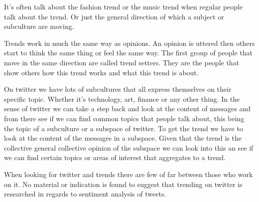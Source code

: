 It's often talk about the fashion trend or the music trend when regular people
talk about the trend. Or just the general direction of which a subject or
subculture are moving. 

Trends work in much the same way as opinions. An opinion is uttered then others start to think the same thing or
feel the same way. The first group of people that move in the same direction
are called trend setters. They are the people that show others how this trend works and
what this trend is about. 

On twitter we have lots of subcultures that all express themselves on their
specific topic. Whether it's technology, art, finance or any other thing.  
In the sense of twitter we can take a step back and look at the content of
messages and from there see if we can find common topics that people talk
about, this being the topic of a subculture or a subspace of twitter. To get
the trend we have to look at the content of the messages in a subspace. Given
that the trend is the collective general collective opinion of the subspace we
can look into this an see if we can find certain topics or areas of interest
that aggregates to a trend. 

When looking for twitter and trends there are few of far between those who work
on it. No material or indication is found to suggest that trending on twitter
is researched in regards to sentiment analysis of tweets.


